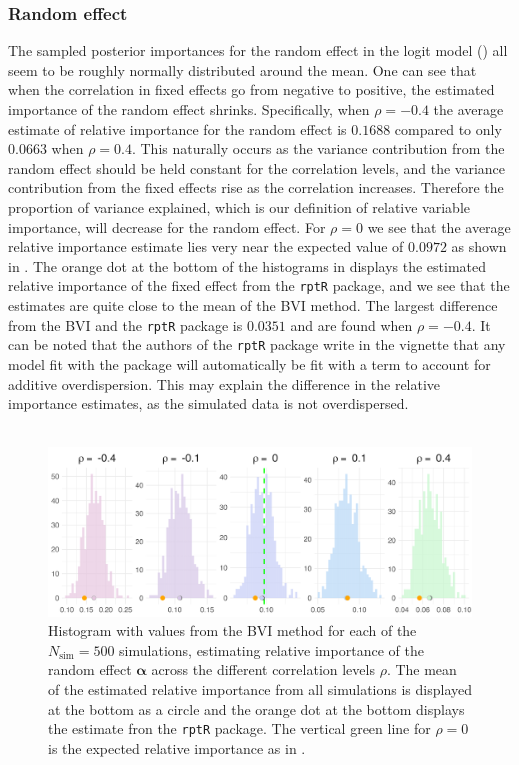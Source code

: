 \subsubsection{Random effect}
The sampled posterior importances for the random effect in the logit model () all seem to be roughly normally distributed around the mean. One can see that when the correlation in fixed effects go from negative to positive, the estimated importance of the random effect shrinks. Specifically, when $\rho=-0.4$ the average estimate of relative importance for the random effect is $0.1688$ compared to only $0.0663$ when $\rho=0.4$. This naturally occurs as the variance contribution from the random effect should be held constant for the correlation levels, and the variance contribution from the fixed effects rise as the correlation increases. Therefore the proportion of variance explained, which is our definition of relative variable importance, will decrease for the random effect. For $\rho=0$ we see that the average relative importance estimate lies very near the expected value of $0.0972$ as shown in . The orange dot at the bottom of the histograms in  displays the estimated relative importance of the fixed effect from the \texttt{rptR} package, and we see that the estimates are quite close to the mean of the BVI method. The largest difference from the BVI and the \texttt{rptR} package is $0.0351$ and are found when $\rho=-0.4$. It can be noted that the authors of the \texttt{rptR} package \citep{Stoffel2017rptR} write in the vignette that any model fit with the package will automatically be fit with a term to account for additive overdispersion. This may explain the difference in the relative importance estimates, as the simulated data is not overdispersed.
\\
\\
\begin{figure}[H]
  \centering
    \includegraphics[width=1\linewidth]{Figures/Simulation study/Random_logit.png}
    \caption[Relative importance of the random effect $\boldsymbol{\alpha}$ in Binomial GLMM]{Histogram with values from the BVI method for each of the $N_{\text{sim}}=500$ simulations, estimating relative importance of the random effect $\boldsymbol{\alpha}$ across the different correlation levels $\rho$. The mean of the estimated relative importance from all simulations is displayed at the bottom as a circle and the orange dot at the bottom displays the estimate fron the \texttt{rptR} package. The vertical green line for $\rho=0$ is the expected relative importance as in .}
    \label{fig:relimp_random_logit}
\end{figure}
